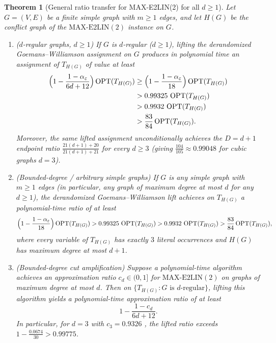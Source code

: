 \documentclass[11pt]{amsart}
\newtheorem{theorem}{Theorem}
\begin{document}
\begin{theorem}[General ratio transfer for MAX-E2LIN(2) for all $d \ge 1$]\label{thm:general-e2lin}
Let $G=(V,E)$ be a finite simple graph with $m \ge 1$ edges, and let $H(G)$ be the conflict graph of the $\mathrm{MAX\text{-}E2LIN}(2)$ instance on $G$.
\begin{enumerate}
\item \emph{($d$-regular graphs, $d \ge 1$)} If $G$ is $d$-regular ($d \ge 1$), lifting the derandomized Goemans--Williamson assignment on $G$ produces in polynomial time an assignment of $T_{H(G)}$ of value at least
\begin{align*}
\Bigl(1 - \frac{1-\alpha_\varepsilon}{6d+12}\Bigr)\operatorname{OPT}(T_{H(G)}) &\ge \Bigl(1 - \frac{1-\alpha_\varepsilon}{18}\Bigr)\operatorname{OPT}(T_{H(G)}) \\
&> 0.99325\,\operatorname{OPT}(T_{H(G)}) \\
&> 0.9932\,\operatorname{OPT}(T_{H(G)}) \\
&> \frac{83}{84}\operatorname{OPT}(T_{H(G)}).
\end{align*}
Moreover, the same lifted assignment unconditionally achieves the $D=d+1$ endpoint ratio $\frac{21(d+1)+20}{21(d+1)+21}$ for every $d \ge 3$ (giving $\frac{104}{105} \approx 0.99048$ for cubic graphs $d=3$).
\item \emph{(Bounded-degree / arbitrary simple graphs)} If $G$ is any simple graph with $m \ge 1$ edges (in particular, any graph of maximum degree at most $d$ for any $d \ge 1$), the derandomized Goemans--Williamson lift achieves on $T_{H(G)}$ a polynomial-time ratio of at least
\[
\Bigl(1 - \frac{1-\alpha_\varepsilon}{18}\Bigr)\operatorname{OPT}(T_{H(G)}) > 0.99325\,\operatorname{OPT}(T_{H(G)}) > 0.9932\,\operatorname{OPT}(T_{H(G)}) > \frac{83}{84}\operatorname{OPT}(T_{H(G)}),
\]
where every variable of $T_{H(G)}$ has exactly $3$ literal occurrences and $H(G)$ has maximum degree at most $d+1$.
\item \emph{(Bounded-degree cut amplification)} Suppose a polynomial-time algorithm achieves an approximation ratio $c_d \in (0,1]$ for $\mathrm{MAX\text{-}E2LIN}(2)$ on graphs of maximum degree at most $d$. Then on $\{T_{H(G)} : G \text{ is } d\text{-regular}\}$, lifting this algorithm yields a polynomial-time approximation ratio of at least
\[
1 - \frac{1-c_d}{6d+12}.
\]
In particular, for $d=3$ with $c_3 = 0.9326$ \cite{HalperinLivnatZwick2004}, the lifted ratio exceeds $1 - \frac{0.0674}{30} > 0.99775$.
\end{enumerate}
\end{theorem}
\end{document}
